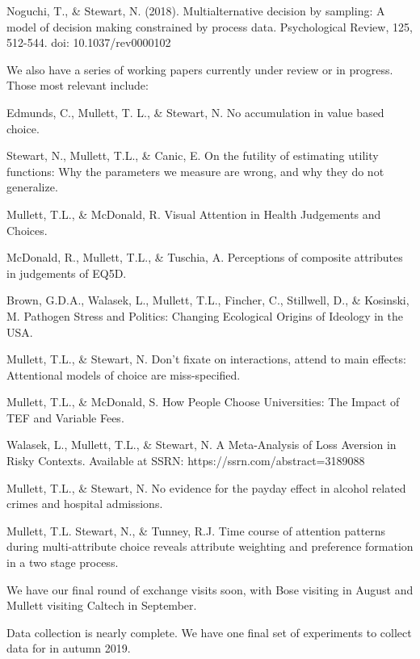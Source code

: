 Noguchi, T., \& Stewart, N. (2018). Multialternative decision by sampling: A model of decision making constrained by process data. Psychological Review, 125, 512-544. doi: 10.1037/rev0000102 


We also have a series of working papers currently under review or in progress. Those most relevant include:

Edmunds, C., Mullett, T. L., \& Stewart, N. No accumulation in value based choice.

Stewart, N., Mullett, T.L., \& Canic, E. On the futility of estimating utility functions: Why the parameters we measure are wrong, and why they do not generalize.

Mullett, T.L., \& McDonald, R. Visual Attention in Health Judgements and Choices.

McDonald, R., Mullett, T.L., \& Tuschia, A. Perceptions of composite attributes in judgements of EQ5D.

Brown, G.D.A., Walasek, L., Mullett, T.L., Fincher, C., Stillwell, D., \& Kosinski, M. Pathogen Stress and Politics: Changing Ecological Origins of Ideology in the USA.

Mullett, T.L., \& Stewart, N. Don’t fixate on interactions, attend to main effects: Attentional models of choice are miss-specified.

Mullett, T.L., \& McDonald, S. How People Choose Universities: The Impact of TEF and Variable Fees.

Walasek, L., Mullett, T.L., \& Stewart, N. A Meta-Analysis of Loss Aversion in Risky Contexts. Available at SSRN: https://ssrn.com/abstract=3189088

Mullett, T.L., \& Stewart, N. No evidence for the payday effect in alcohol related crimes and hospital admissions.

Mullett, T.L. Stewart, N., \& Tunney, R.J. Time course of attention patterns during multi-attribute choice reveals attribute weighting and preference formation in a two stage process.

We have our final round of exchange visits soon, with Bose visiting in August and Mullett visiting Caltech in September. 

Data collection is nearly complete. We have one final set of experiments to collect data for in autumn 2019.


